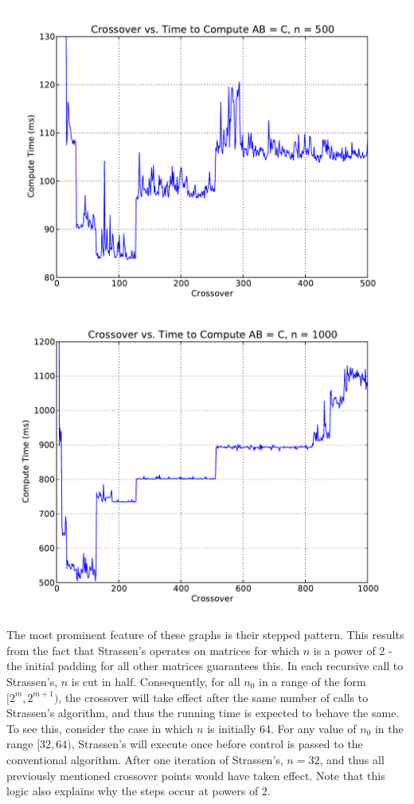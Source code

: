 \documentclass[solution, letterpaper]{cs121}
\begin{document}
\begin{center}
\includegraphics[scale=0.72]{crossover-v-compute-time-500-msec.pdf}
\includegraphics[scale=0.72]{crossover-v-compute-time-1000-msec.pdf}
\end{center}

The most prominent feature of these graphs is their stepped pattern. This results from the fact that Strassen's operates on matrices for which $n$ is a power of 2 - the initial padding for all other matrices guarantees this. In each recursive call to Strassen's, $n$ is cut in half. Consequently, for all $n_0$ in a range of the form $[2^m, 2^{m+1})$, the crossover will take effect after the same number of calls to Strassen's algorithm, and thus the running time is expected to behave the same. To see this, consider the case in which $n$ is initially 64. For any value of $n_0$ in the range $[32,64)$, Strassen's will execute once before control is passed to the conventional algorithm. After one iteration of Strassen's, $n= 32$, and thus all previously mentioned crossover points would have taken effect. Note that this logic also explains why the steps occur at powers of 2.
\end{document}
